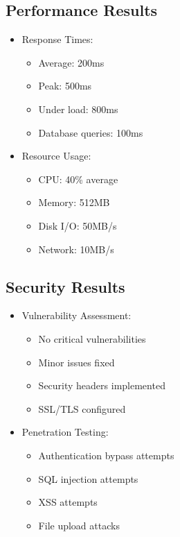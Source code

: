 \subsection{Performance Results}
\begin{itemize}
    \item Response Times:
    \begin{itemize}
        \item Average: 200ms
        \item Peak: 500ms
        \item Under load: 800ms
        \item Database queries: 100ms
    \end{itemize}
    \item Resource Usage:
    \begin{itemize}
        \item CPU: 40\% average
        \item Memory: 512MB
        \item Disk I/O: 50MB/s
        \item Network: 10MB/s
    \end{itemize}
\end{itemize}

\subsection{Security Results}
\begin{itemize}
    \item Vulnerability Assessment:
    \begin{itemize}
        \item No critical vulnerabilities
        \item Minor issues fixed
        \item Security headers implemented
        \item SSL/TLS configured
    \end{itemize}
    \item Penetration Testing:
    \begin{itemize}
        \item Authentication bypass attempts
        \item SQL injection attempts
        \item XSS attempts
        \item File upload attacks
    \end{itemize}
\end{itemize}

